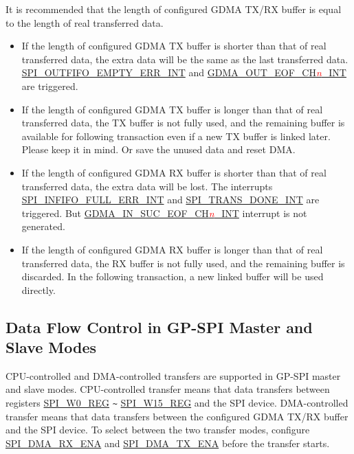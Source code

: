 \documentclass[main\_\_EN.tex]{subfiles}
\begin{document}
It is recommended that the length of configured GDMA TX/RX buffer is equal to the length of real transferred data.

\begin{itemize}
    \item If the length of configured GDMA TX buffer is shorter than that of real transferred data, the extra data will be the same as the last transferred data. \hyperref[int:SPIOUTFIFOEMPTYERRINT]{SPI\_OUTFIFO\_EMPTY\_ERR\_INT} and \hyperref[int:GDMAOUTEOFINT]{GDMA\_OUT\_EOF\_CH\textcolor{red}{\it{n}}\_INT} are triggered.

    \item If the length of configured GDMA TX buffer is longer than that of real transferred data, the TX buffer is not fully used, and the remaining buffer is available for following transaction even if a new TX buffer is linked later. Please keep it in mind. Or save the unused data and reset DMA.

    \item If the length of configured GDMA RX buffer is shorter than that of real transferred data, the extra data will be lost. The interrupts \hyperref[int:SPIINFIFOFULLERRINT]{SPI\_INFIFO\_FULL\_ERR\_INT} and \hyperref[int:SPITRANSDONEINT]{SPI\_TRANS\_DONE\_INT} are triggered. But \hyperref[int:GDMAINSUCEOFINT]{GDMA\_IN\_SUC\_EOF\_CH\textcolor{red}{\it{n}}\_INT} interrupt is not generated.

    \item If the length of configured GDMA RX buffer is longer than that of real transferred data, the RX buffer is not fully used, and the remaining buffer is discarded. In the following transaction, a new linked buffer will be used directly.

\end{itemize}

\subsection{Data Flow Control in GP-SPI Master and Slave Modes}\label{Subsection:Data Flow Control in GP-SPI Master and Slave Mode}

CPU-controlled and DMA-controlled transfers are supported in GP-SPI master and slave modes.
CPU-controlled transfer means that data transfers between registers \hyperref[regdesc:SPIW0REG]{SPI\_W0\_REG} \verb+~+ \hyperref[regdesc:SPIW15REG]{SPI\_W15\_REG} and the SPI device. DMA-controlled transfer means that data transfers between the configured GDMA TX/RX buffer and the SPI device. To select between the two transfer modes, configure \hyperref[fielddesc:SPIDMARXENA]{SPI\_DMA\_RX\_ENA} and \hyperref[fielddesc:SPIDMATXENA]{SPI\_DMA\_TX\_ENA} before the transfer starts.
\end{document}
